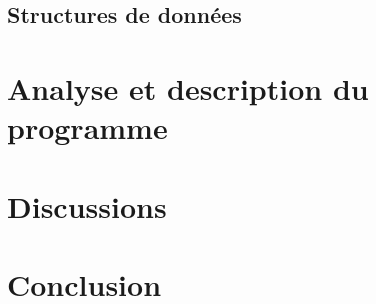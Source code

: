 \documentclass[12pt,french]{article}
\begin{document}
        \subsection{Structures de données} %
        \label{sub:struct-donnes}
        

    \section{Analyse et description du programme} %
    \label{sec:analyse-desc}
    

    \section{Discussions} %
    \label{sec:discussions}
    

    \section{Conclusion} %
    \label{sec:Conclusion}
    

\end{document}
